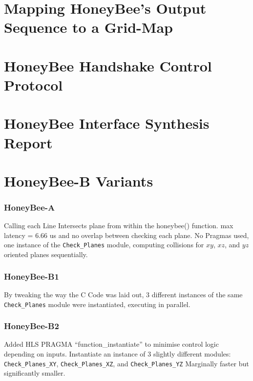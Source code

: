 \newpage 
\section{Mapping HoneyBee's Output Sequence to a Grid-Map}
\label{section:honeybee_appendix_mapping}
    

\section{HoneyBee Handshake Control Protocol}
\label{section:honeybee_appendix_handshake}
    

\section{HoneyBee Interface Synthesis Report}
\label{section:honeybee_appendix_synthesis_report}
    

\section{HoneyBee-B Variants}
\label{section:honeybee_appendix_hbb_variants}
    \subsubsection{HoneyBee-A}
    Calling each Line Intersects plane from within the honeybee() function. 
    max latency = 6.66 us and no overlap between checking each plane.
    No Pragmas used, one instance of the \texttt{Check\_Planes} module, computing collisions for $xy$, $xz$, and $yz$ oriented planes sequentially.

    \subsubsection{HoneyBee-B1}
    By tweaking the way the C Code was laid out, 3 different instances of the same \texttt{Check\_Planes} module were instantiated, executing in parallel.

    \subsubsection{HoneyBee-B2}
    Added HLS PRAGMA ``function\_instantiate'' to minimise control logic depending on inputs. Instantiate an instance of 3 slightly different modules: \texttt{Check\_Planes\_XY}, \texttt{Check\_Planes\_XZ}, and \texttt{Check\_Planes\_YZ}
    Marginally faster but significantly smaller.

